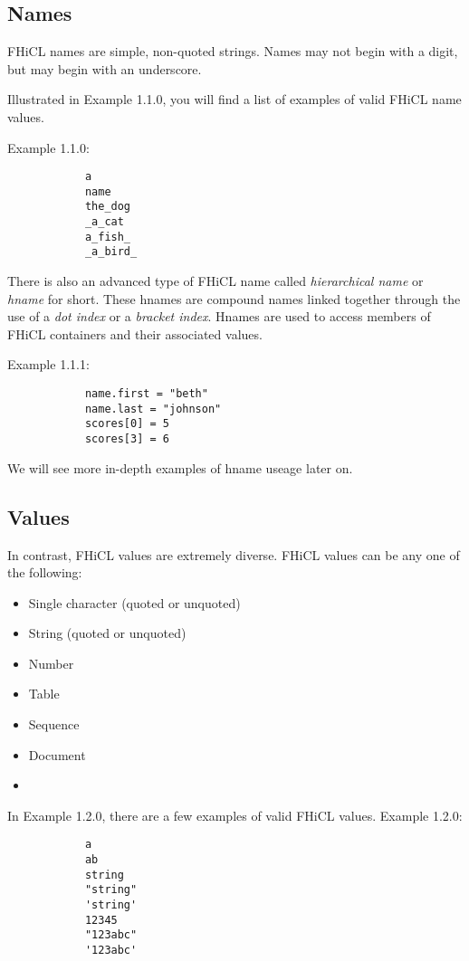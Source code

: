 \documentclass{article}
\begin{document}
        \subsection{Names}
		FHiCL names are simple, non-quoted strings.
		Names may not begin with a digit,
		but may begin with an underscore.
		\par
		Illustrated in Example 1.1.0,
		you will find a list of examples of valid FHiCL name values.
		\par
		Example 1.1.0:
		\begin{verbatim}
			a
			name
			the_dog
			_a_cat
			a_fish_
			_a_bird_
		\end{verbatim}
		\par
		There is also an advanced type of FHiCL name called 
		\emph{hierarchical name} or \emph{hname} for short.
		These hnames are compound names linked together through the use of
		a \emph{dot index} or a \emph{bracket index}.
		Hnames are used to access members of FHiCL containers
		and their associated values.
		\par
		Example 1.1.1:
		\begin{verbatim}
			name.first = "beth"
			name.last = "johnson"
			scores[0] = 5
			scores[3] = 6
		\end{verbatim}
		\par
		We will see more in-depth examples of hname useage later on.
	\subsection{Values}
		In contrast, FHiCL values are extremely diverse.
		FHiCL values can be any one of the following:
		\begin{itemize}
			\item Single character (quoted or unquoted)
			\item String (quoted or unquoted)
			\item Number
			\item Table
			\item Sequence
			\item Document
			\item 
		\end{itemize}
		\par
		In Example 1.2.0, there are a few examples of valid FHiCL values.
		Example 1.2.0:
		\begin{verbatim}
			a
			ab
			string
			"string"
			'string'
			12345
			"123abc"
			'123abc'
		\end{verbatim}
\end{document}

